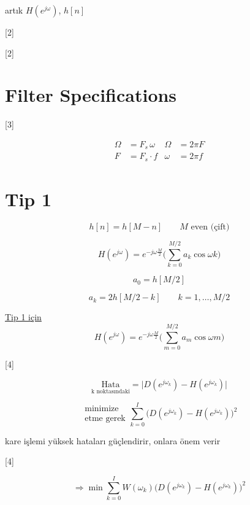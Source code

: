 \documentclass[11pt,a4paper]{article}
\begin{document}
artık $H(e^{j\omega})$, $h[n]$ 

[2]

[2]

\section{Filter Specifications}

[3]

\begin{align*}
\Omega &= F_s\,\omega & \Omega &= 2\pi F \\
F &= F_s \cdot f & \omega &= 2\pi f
\end{align*}


\section{Tip 1}

\[ h[n] = h[M-n] \qquad M \text{ even (çift)} \]

\[ H(e^{j\omega}) = e^{-j\omega\frac{M}{2}} \Big( \sum_{k=0}^{M/2} a_k \cos\omega k \Big) \]

\[ a_0 = h[M/2] \]

\[ a_k = 2h[M/2 - k] \qquad k = 1,\ldots,M/2 \]

\underline{Tip 1 için}
\[ H(e^{j\omega}) = e^{-j\omega\frac{M}{2}} \Big( \sum_{m=0}^{M/2} a_m \cos\omega m \Big) \]

[4]

\[ \underset{\text{k noktasındaki}}{\text{Hata}} = \big| D(e^{j\omega_k}) - H(e^{j\omega_k}) \big| \]

\[ \begin{array}{c} \text{minimize} \\ \text{etme gerek} \end{array} \sum_{k=0}^{I} \big( D(e^{j\omega_k}) - H(e^{j\omega_k}) \big)^2 \]

kare işlemi yüksek hataları güçlendirir, onlara önem verir

[4]

\[ \Longrightarrow \min \sum_{k=0}^{I} W(\omega_k)\big( D(e^{j\omega_k}) - H(e^{j\omega_k}) \big)^2 \]
\end{document}
